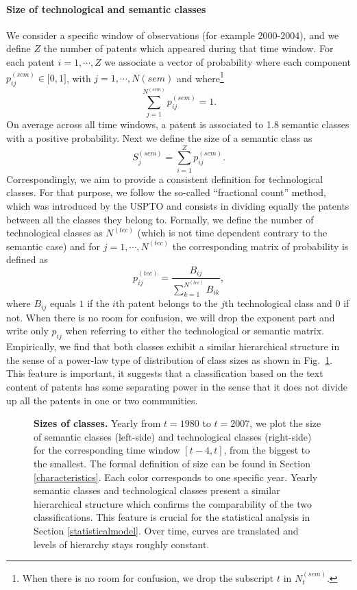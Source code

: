\documentclass[10pt,A4,draft]{article}
\begin{document}
\paragraph*{Size of technological and semantic classes} 
We consider a specific window of observations (for example 2000-2004), and we define $Z$ the number of patents which appeared during that time window. For each patent $i=1, \cdots, Z$ we associate a vector of probability where each component $p_{ij}^{(sem)} \in \big[ 0,1 \big]$, with  $j = 1, \cdots, N{(sem)}$ and where\footnote{When there is no room for confusion, we drop the subscript $t$ in $N_t^{(sem)}$.} 
$$\displaystyle \sum_{j=1}^{N^{(sem)}} p_{ij}^{(sem)} = 1.$$ On average across all time windows, a patent is associated to 1.8 semantic classes with a positive probability. Next we define the size of a semantic class as $$S_j^{(sem)} = \displaystyle \sum_{i=1}^Z p_{ij}^{(sem)}.$$ 
Correspondingly, we aim to provide a consistent definition for technological classes. For that purpose, we follow the so-called ``fractional count'' method, which was introduced by the USPTO and consists in dividing equally the patents between all the classes they belong to. Formally, we define the number of technological classes as
$N^{(tec)}$  (which is not time dependent contrary to the semantic case) and for $j = 1, \cdots, N^{(tec)}$ the corresponding matrix of probability is defined as
\[
 p_{ij}^{(tec)} = \frac{B_{ij}}{\displaystyle \sum_{k=1}^{N^{(tec)}}{B_{ik}}},
\]
where  $B_{ij}$ equals $1$ if the $i$th patent belongs to the $j$th technological class and $0$ if not. When there is no room for confusion, we will drop the exponent part and write only $p_{ij}$ when referring to either the technological or semantic matrix. Empirically, we find that both classes exhibit a similar hierarchical structure in the sense of a power-law type of distribution of class sizes as shown in Fig.~\ref{fig:class-sizes}. This feature is important, it suggests that a classification based on the text content of patents has some separating power in the sense that it does not divide up all the patents in one or two communities. 

\begin{figure}
\centering
\hspace*{-2.5cm}
\caption{\textbf{Sizes of classes.} Yearly from $t = 1980$ to $t =2007$, we plot the size of semantic classes (left-side) and technological classes (right-side) for the corresponding time window $[t-4, t]$, 
from the biggest to the smallest. The formal definition of size can be found in Section \ref{characteristics}. Each color corresponds to one specific year. Yearly semantic classes and technological classes present a similar hierarchical structure which confirms the comparability of the two classifications. This feature is crucial for the statistical analysis in Section \ref{statisticalmodel}. Over time, curves are translated and levels of hierarchy stays roughly constant.}
\label{fig:class-sizes}
\end{figure}
\end{document}
